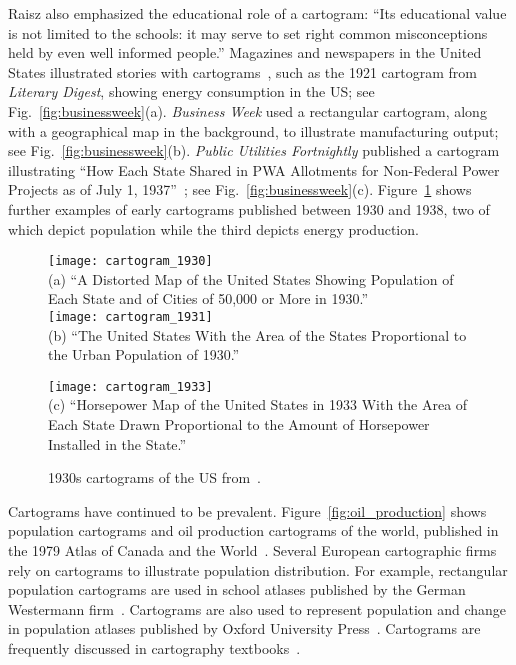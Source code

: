 \documentclass{egpubl}
\begin{document}
 Raisz also emphasized the educational role of a cartogram: ``Its educational value is not limited to the schools: it may serve to set right common misconceptions held by even well informed people.'' Magazines and newspapers in the United States illustrated stories with cartograms~\cite{john_carto}, such as the 1921 cartogram from {\em Literary Digest}, showing energy consumption in the US; see Fig.~\ref{fig:businessweek}(a).
{\em Business Week} used a rectangular cartogram, along with a geographical map in the background, to illustrate manufacturing output; see Fig.~\ref{fig:businessweek}(b). 
{\em Public Utilities Fortnightly} published a cartogram illustrating ``How Each State Shared in PWA Allotments for Non-Federal Power Projects as of July 1, 1937''~\cite{john_carto}; see Fig.~\ref{fig:businessweek}(c).
Figure~\ref{fig:cartograms_old_school}  shows further examples of early cartograms published between 1930 and 1938, two of which depict population while the third depicts energy production.





\begin{figure}[htbp]
\centering
\vspace{.2cm}
\texttt{[image: cartogram\_1930]}\\
(a) ``A Distorted Map of the United States Showing Population of Each State and of Cities of 50,000 or More in 1930.'' \\\vspace{.25cm}
\texttt{[image: cartogram\_1931]}\\

(b) ``The United States With the Area of the States Proportional to the Urban Population of 1930.'' \\\vspace{.25cm}

\texttt{[image: cartogram\_1933]}\\
(c)  ``Horsepower Map of the United States in 1933 With the Area of Each State Drawn Proportional to the Amount of Horsepower Installed in the State.'' \\
 \caption{1930s cartograms of the US from~\cite{john_carto}.}
\label{fig:cartograms_old_school}
\end{figure}


Cartograms have continued to be prevalent.
Figure~\ref{fig:oil_production} shows population cartograms and oil production cartograms of the world, published in the 1979 Atlas of Canada and the World~\cite{Philip_atlas}. 
Several European cartographic firms rely on cartograms to illustrate population distribution. For example, rectangular population cartograms are used in school atlases published by the German Westermann firm~\cite{German_atlas}. Cartograms are also used to represent population and change in population atlases published by Oxford University Press~\cite{Oxford_atlas}. Cartograms are frequently discussed in cartography textbooks~\cite{Dent, Slocum}.
\end{document}
